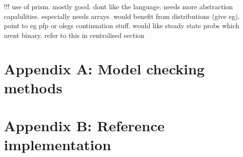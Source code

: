 \documentclass[a4paper,10pt]{article}
\begin{document}
!!! use of prism. mostly good. dont like the language. needs more abstraction capabilities. especially needs arrays. would benefit from distributions (give eg). point to eg pfp or olegs continuation stuff. would like steady state probs which arent binary. refer to this in centralised section 

\section{Appendix A: Model checking methods}

\section{Appendix B: Reference implementation}

\nocite{*}



\end{document}
